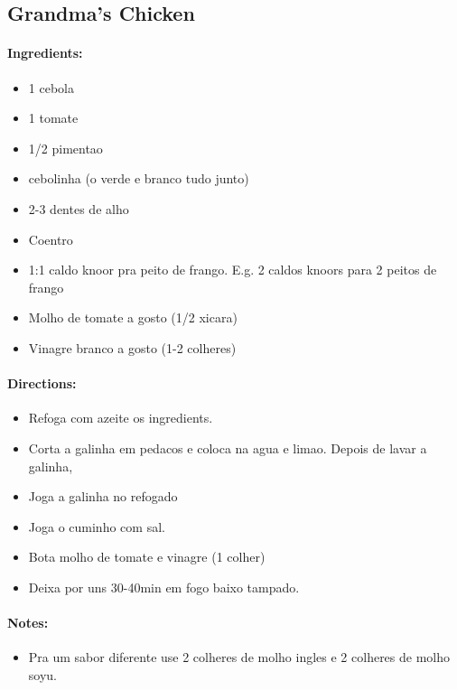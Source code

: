 \documentclass{article}
\begin{document}
\subsection{Grandma’s Chicken}

\paragraph{Ingredients:}
\begin{itemize}
    \item 1 cebola
    \item 1 tomate
    \item 1/2 pimentao
    \item cebolinha (o verde e branco tudo junto)
    \item 2-3 dentes de alho
    \item Coentro
    \item 1:1 caldo knoor pra peito de frango. E.g. 2 caldos knoors para 2 peitos de frango
    \item Molho de tomate a gosto (1/2 xicara)
    \item Vinagre branco a gosto (1-2 colheres)
\end{itemize}

\paragraph{Directions:}
\begin{itemize}
    \item Refoga com azeite os ingredients.
    \item Corta a galinha em pedacos e coloca na agua e limao. Depois de lavar a galinha,
    \item Joga a galinha no refogado
    \item Joga o cuminho com sal.
    \item Bota molho de tomate e vinagre (1 colher)
    \item Deixa por uns 30-40min em fogo baixo tampado.
\end{itemize}

\paragraph{Notes:}
\begin{itemize}
    \item Pra um sabor diferente use 2 colheres de molho ingles e 2 colheres de molho soyu.
\end{itemize}
\end{document}
